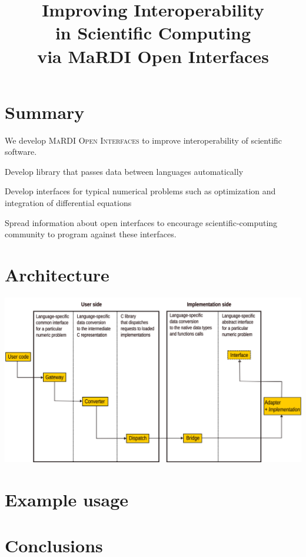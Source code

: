 \documentclass{mmposter}
\title{Improving Interoperability\\in Scientific Computing\\via MaRDI Open Interfaces}
\newcommand{\OIF}{\textsc{MaRDI Open Interfaces}\xspace}
\begin{document}


\maketitle

\section*{Summary}
We develop \OIF{} to improve interoperability of scientific software.

\begin{objectives}
  \item Develop library that passes data between languages automatically
  \item Develop interfaces for typical numerical problems
  such as optimization and integration of differential equations
  \item Spread information about open interfaces to encourage
  scientific-computing community to program against these interfaces.
\end{objectives}

\section*{Architecture}
\includegraphics[width=\columnwidth]{arch.png}

\newpage

\section*{Example usage}
\lipsum[2]

\section*{Conclusions}
\lipsum[3]
\end{document}
